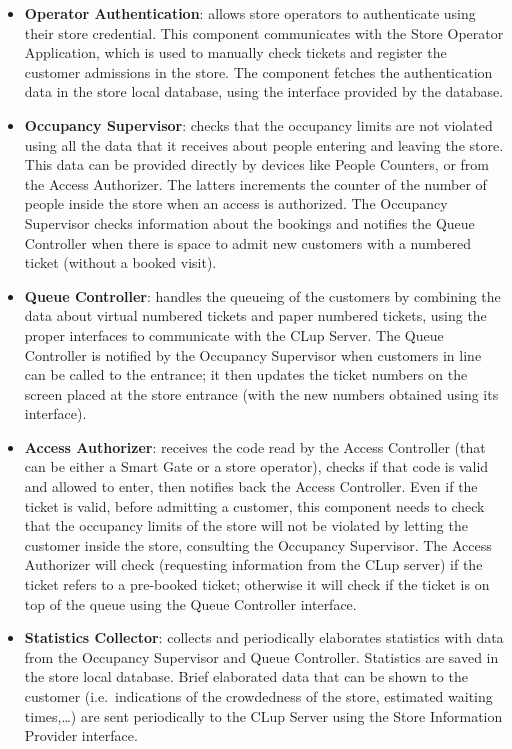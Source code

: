 \begin{itemize}
    \item \textbf{Operator Authentication}: allows store operators to authenticate using their store credential. This component communicates with the Store Operator Application, which is used to manually check tickets and register the customer admissions in the store. The component fetches the authentication data in the store local database, using the interface provided by the database.
    \item \textbf{Occupancy Supervisor}: checks that the occupancy limits are not violated using all the data that it receives about people entering and leaving the store. This data can be provided directly by devices like People Counters, or from the Access Authorizer. The latters increments the counter of the number of people inside the store when an access is authorized. The Occupancy Supervisor checks information about the bookings and notifies the Queue Controller when there is space to admit new customers with a numbered ticket (without a booked visit).
    \item \textbf{Queue Controller}: handles the queueing of the customers by combining the data about virtual numbered tickets and paper numbered tickets, using the proper interfaces to communicate with the CLup Server. The Queue Controller is notified by the Occupancy Supervisor when customers in line can be called to the entrance; it then updates the ticket numbers on the screen placed at the store entrance (with the new numbers obtained using its interface).
    \item \textbf{Access Authorizer}: receives the code read by the Access Controller (that can be either a Smart Gate or a store operator), checks if that code is valid and allowed to enter, then notifies back the Access Controller. Even if the ticket is valid, before admitting a customer, this component needs to check that the occupancy limits of the store will not be violated by letting the customer inside the store, consulting the Occupancy Supervisor. The Access Authorizer will check (requesting information from the CLup server) if the ticket refers to a pre-booked ticket; otherwise it will check if the ticket is on top of the queue using the Queue Controller interface.
    \item \textbf{Statistics Collector}: collects and periodically elaborates statistics with data from the Occupancy Supervisor and Queue Controller. Statistics are saved in the store local database. Brief elaborated data that can be shown to the customer (i.e.~indications of the crowdedness of the store, estimated waiting times,\ldots) are sent periodically to the CLup Server using the Store Information Provider interface.
\end{itemize}

